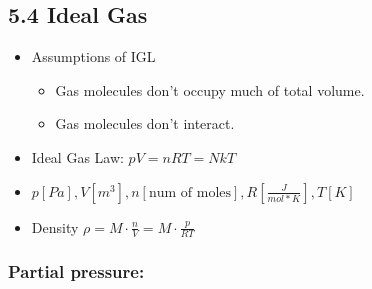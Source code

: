 \subsection{5.4 Ideal Gas}
    \begin{itemize}
        \itemsep0em
        \item Assumptions of IGL\:
        \begin{itemize}
            \itemsep0em
            \item Gas molecules don't occupy much of total volume.
            \item Gas molecules don't interact.
        \end{itemize}
        \item Ideal Gas Law: $pV = nRT=N kT$
        \item $p\left[Pa\right], V\left[m^3\right], n\left[\text{num of moles}\right], R\left[\frac{J}{mol*K}\right], T\left[K\right]$
        \item Density $\rho = M \cdot \frac{n}{V} = M \cdot \frac{p}{RT}$
    \end{itemize}
    \subsubsection{Partial pressure:}

